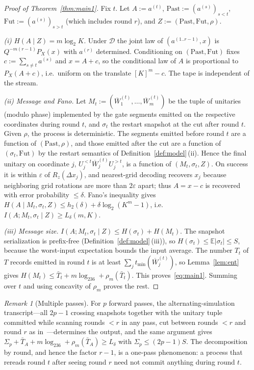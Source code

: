 \documentclass[aps,prx,twocolumn,superscriptaddress,nofootinbib,longbibliography]{revtex4-2}
\theoremstyle{plain}
\theoremstyle{definition}
\theoremstyle{remark}
\newtheorem{remark}{Remark}
\newcommand{\E}{\mathbb{E}}
\begin{document}
\begin{proof}[Proof of Theorem~\ref{thm:main1}]
Fix $t$. Let $A:=a^{(t)}$, $\mathrm{Past}:=(a^{(s)})_{s<t}$, $\mathrm{Fut}:=(a^{(s)})_{s>t}$ (which includes round $r$), and $Z:=(\mathrm{Past},\mathrm{Fut},\rho)$.

\emph{(i) $H(A\mid Z)=m\log_2K$.} Under $\mathcal D$ the joint law of $(a^{(1..r-1)},x)$ is $Q^{-m(r-1)}P_X(x)$ with $a^{(r)}$ determined. Conditioning on $(\mathrm{Past},\mathrm{Fut})$ fixes $c:=\sum_{s\ne t}a^{(s)}$ and $x=A+c$, so the conditional law of $A$ is proportional to $P_X(A+c)$, i.e.\ uniform on the translate $[K]^m-c$. The tape is independent of the stream.

\emph{(ii) Message and Fano.} Let $M_t:=(\overline W^{(t)}_1,\dots,\overline W^{(t)}_m)$ be the tuple of unitaries (modulo phase) implemented by the gate segments emitted on the respective coordinates during round $t$, and $\sigma_t$ the restart snapshot at the cut after round $t$. Given $\rho$, the process is deterministic. The segments emitted before round $t$ are a function of $(\mathrm{Past},\rho)$, and those emitted after the cut are a function of $(\sigma_t,\mathrm{Fut})$ by the restart semantics of Definition~\ref{def:model}\,(ii). Hence the final unitary on coordinate $j$, $U^{<t}_j\overline W^{(t)}_jU^{>t}_j$, is a function of $(M_t,\sigma_t,Z)$. On success it is within $\varepsilon$ of $R_z(\Delta x_j)$, and nearest-grid decoding recovers $x_j$ because neighboring grid rotations are more than $2\varepsilon$ apart; thus $A=x-c$ is recovered with error probability $\le\delta$. Fano's inequality gives $H(A\mid M_t,\sigma_t,Z)\le h_2(\delta)+\delta\log_2(K^m-1)$, i.e.\ $I(A;M_t,\sigma_t\mid Z)\ge L_\delta(m,K)$.

\emph{(iii) Message size.} $I(A;M_t,\sigma_t\mid Z)\le H(\sigma_t)+H(M_t)$. The snapshot serialization is prefix-free (Definition~\ref{def:model}\,(iii)), so $H(\sigma_t)\le\E|\sigma_t|\le S$, because the worst-input expectation bounds the input average. The number $T_t$ of $T$ records emitted in round $t$ is at least $\sum_jt_{\min}(\overline W^{(t)}_j)$, so Lemma~\ref{lem:ent} gives $H(M_t)\le\bar T_t+m\log_236+\rho_m(\bar T_t)$. This proves~\eqref{eq:main1}. Summing over $t$ and using concavity of $\rho_m$ proves the rest.
\end{proof}

\begin{remark}[Multiple passes]
For $p$ forward passes, the alternating-simulation transcript---all $2p-1$ crossing snapshots together with the unitary tuple committed while scanning rounds $<r$ in any pass, cut between rounds $<r$ and round $r$ as in~\cite{Paper1}---determines the output, and the same argument gives $\Sigma_p+\bar T_A+m\log_236+\rho_m(\bar T_A)\ge L_\delta$ with $\Sigma_p\le(2p-1)S$. The decomposition by round, and hence the factor $r-1$, is a one-pass phenomenon: a process that rereads round $t$ after seeing round $r$ need not commit anything during round $t$.
\end{remark}
\end{document}
